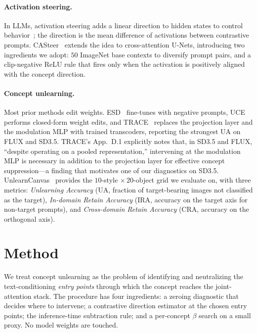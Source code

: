 \documentclass{article}
\begin{document}
\paragraph{Activation steering.}
In LLMs, activation steering adds a linear direction to hidden states
to control behavior~\cite{turner2024steering,panickssery2024steering};
the direction is the mean difference of activations between
contrastive prompts. CASteer~\cite{khrulkov2024casteer} extends the
idea to cross-attention U-Nets, introducing two ingredients we
adopt: $50$ ImageNet base contexts to diversify prompt pairs, and a
clip-negative ReLU rule that fires only when the activation is
positively aligned with the concept direction.

\paragraph{Concept unlearning.}
Most prior methods edit weights. ESD~\cite{gandikota2023erasing}
fine-tunes with negative prompts, UCE~\cite{gandikota2024unified}
performs closed-form weight edits, and TRACE~\cite{tracepaper}
replaces the projection layer and the modulation MLP with trained
transcoders, reporting the strongest UA on FLUX and SD3.5. TRACE's
App.~D.1 explicitly notes that, in SD3.5 and FLUX, ``despite operating
on a pooled representation,'' intervening at the modulation MLP is
necessary in addition to the projection layer for effective concept
suppression---a finding that motivates one of our diagnostics on
SD3.5. UnlearnCanvas~\cite{zhang2024unlearncanvas} provides the
$10$-style $\times\,20$-object grid we evaluate on, with three
metrics: \emph{Unlearning Accuracy} (UA, fraction of target-bearing
images not classified as the target), \emph{In-domain Retain
Accuracy} (IRA, accuracy on the target axis for non-target prompts),
and \emph{Cross-domain Retain Accuracy} (CRA, accuracy on the
orthogonal axis).

\section{Method}
\label{sec:method}

We treat concept unlearning as the problem of identifying and
neutralizing the text-conditioning \emph{entry points} through which
the concept reaches the joint-attention stack. The procedure has
four ingredients: a zeroing diagnostic that decides where to
intervene; a contrastive direction estimator at the chosen entry
points; the inference-time subtraction rule; and a per-concept
$\beta$ search on a small proxy. No model weights are touched.
\end{document}
